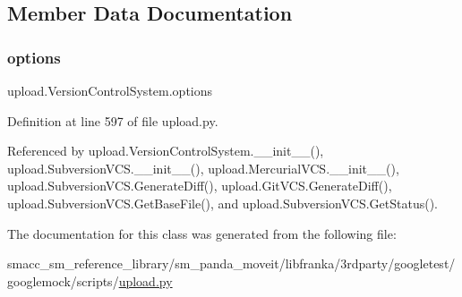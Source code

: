 \subsection{Member Data Documentation}
\mbox{\label{classupload_1_1VersionControlSystem_a4d57d043bc408887b94269fe4cea9556}} 
\subsubsection{\texorpdfstring{options}{options}}
{\footnotesize\ttfamily upload.\+Version\+Control\+System.\+options}



Definition at line 597 of file upload.\+py.



Referenced by upload.\+Version\+Control\+System.\+\_\+\+\_\+init\+\_\+\+\_\+(), upload.\+Subversion\+V\+C\+S.\+\_\+\+\_\+init\+\_\+\+\_\+(), upload.\+Mercurial\+V\+C\+S.\+\_\+\+\_\+init\+\_\+\+\_\+(), upload.\+Subversion\+V\+C\+S.\+Generate\+Diff(), upload.\+Git\+V\+C\+S.\+Generate\+Diff(), upload.\+Subversion\+V\+C\+S.\+Get\+Base\+File(), and upload.\+Subversion\+V\+C\+S.\+Get\+Status().



The documentation for this class was generated from the following file\+:\begin{DoxyCompactItemize}
\item 
smacc\+\_\+sm\+\_\+reference\+\_\+library/sm\+\_\+panda\+\_\+moveit/libfranka/3rdparty/googletest/googlemock/scripts/\hyperlink{googlemock_2scripts_2upload_8py}{upload.\+py}\end{DoxyCompactItemize}
